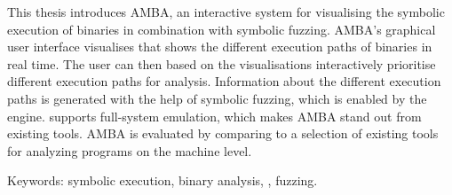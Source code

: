 This thesis introduces AMBA, an interactive system for visualising the symbolic execution of binaries in combination with symbolic fuzzing.
AMBA's graphical user interface visualises that shows the different execution paths of binaries in real time.
The user can then based on the visualisations interactively prioritise different execution paths for analysis.
Information about the different execution paths is generated with the help of symbolic fuzzing, which is enabled by the \stoe{} engine.
\stoe{} supports full-system emulation, which makes AMBA stand out from existing tools.
AMBA is evaluated by comparing to a selection of existing tools for analyzing programs on the machine level.

Keywords: symbolic execution, binary analysis, \stoe{}, fuzzing.
